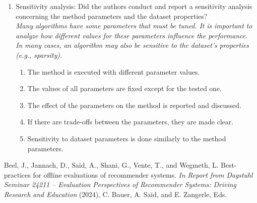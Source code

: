 \documentclass{article}
\begin{document}
\begin{enumerate}
    \item Sensitivity analysis: 
    Did the authors conduct and report a sensitivity analysis concerning the method parameters and the dataset properties? 
    \\ \emph{Many algorithms have some parameters that must be tuned. It is important to analyze how different values for these parameters influence the performance. In many cases, an algorithm may also be sensitive to the dataset's properties (e.g., sparsity).}
    \begin{enumerate} [label*=\arabic*.]
        \item The method is executed with different parameter values.
        \item The values of all parameters are fixed except for the tested one.
        \item The effect of the parameters on the method is reported and discussed.
        \item If there are trade-offs between the parameters, they are made clear.
        \item Sensitivity to dataset parameters is done similarly to the method parameters.
    \end{enumerate}
\end{enumerate}

\begin{thebibliography}{9}
Beel, J., Jannach, D., Said, A., Shani, G., Vente, T., and Wegmeth, L. Best-practices for offline evaluations of recommender systems. \textit{In Report from Dagstuhl Seminar 24211 – Evaluation Perspectives of Recommender
Systems: Driving Research and Education} (2024), C. Bauer, A. Said, and
E. Zangerle, Eds.


\end{thebibliography}
\end{document}

